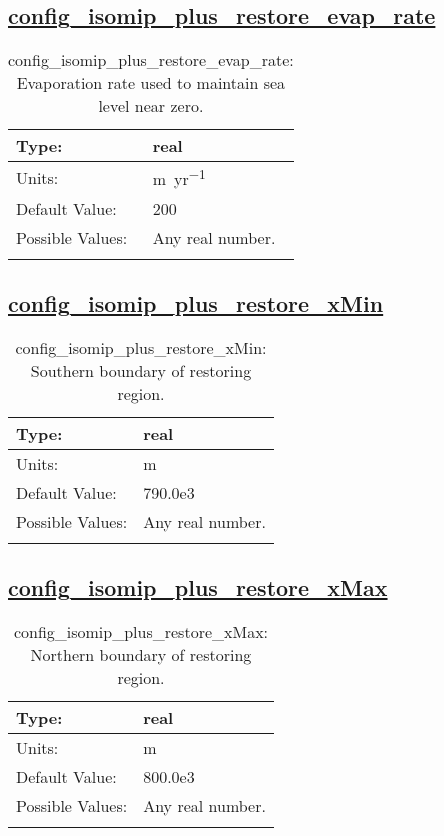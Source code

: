 \subsection[config\_isomip\_plus\_restore\_evap\_rate]{\hyperref[sec:nm_tab_isomip_plus]{config\_isomip\_plus\_restore\_evap\_rate}}
\label{subsec:nm_sec_config_isomip_plus_restore_evap_rate}
\begin{center}
\begin{longtable}{| p{2.0in} || p{4.0in} |}
    \hline
    Type: & real \\
    \hline
    Units: & \si{m.yr^{-1}} \\
    \hline
    Default Value: & 200 \\
    \hline
    Possible Values: & Any real number. \\
    \hline
    \caption{config\_isomip\_plus\_restore\_evap\_rate: Evaporation rate used to maintain sea level near zero.}
\end{longtable}
\end{center}
\subsection[config\_isomip\_plus\_restore\_xMin]{\hyperref[sec:nm_tab_isomip_plus]{config\_isomip\_plus\_restore\_xMin}}
\label{subsec:nm_sec_config_isomip_plus_restore_xMin}
\begin{center}
\begin{longtable}{| p{2.0in} || p{4.0in} |}
    \hline
    Type: & real \\
    \hline
    Units: & \si{m} \\
    \hline
    Default Value: & 790.0e3 \\
    \hline
    Possible Values: & Any real number. \\
    \hline
    \caption{config\_isomip\_plus\_restore\_xMin: Southern boundary of restoring region.}
\end{longtable}
\end{center}
\subsection[config\_isomip\_plus\_restore\_xMax]{\hyperref[sec:nm_tab_isomip_plus]{config\_isomip\_plus\_restore\_xMax}}
\label{subsec:nm_sec_config_isomip_plus_restore_xMax}
\begin{center}
\begin{longtable}{| p{2.0in} || p{4.0in} |}
    \hline
    Type: & real \\
    \hline
    Units: & \si{m} \\
    \hline
    Default Value: & 800.0e3 \\
    \hline
    Possible Values: & Any real number. \\
    \hline
    \caption{config\_isomip\_plus\_restore\_xMax: Northern boundary of restoring region.}
\end{longtable}
\end{center}
